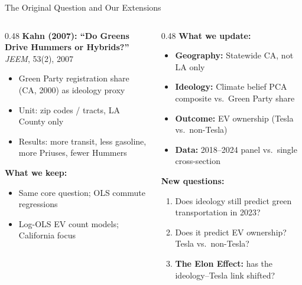 \documentclass[aspectratio=169,t]{beamer}
\begin{document}
\begin{frame}{The Original Question and Our Extensions}
  \begin{columns}[T]
    \begin{column}{0.48\textwidth}
      \footnotesize
      \textbf{Kahn (2007): ``Do Greens Drive Hummers or Hybrids?''}\\
      \textit{JEEM}, 53(2), 2007
      \begin{itemize}
        \item Green Party registration share (CA, 2000) as ideology proxy
        \item Unit: zip codes / tracts, LA County only
        \item Results: more transit, less gasoline, more Priuses, fewer Hummers
      \end{itemize}
      \textbf{What we keep:}
      \begin{itemize}
        \item Same core question; OLS commute regressions
        \item Log-OLS EV count models; California focus
      \end{itemize}
    \end{column}
    \begin{column}{0.48\textwidth}
      \footnotesize
      \textbf{What we update:}
      \begin{itemize}
        \item \textbf{Geography:} Statewide CA, not LA only
        \item \textbf{Ideology:} Climate belief PCA composite
              vs.\ Green Party share
        \item \textbf{Outcome:} EV ownership (Tesla vs.\ non-Tesla)
        \item \textbf{Data:} 2018--2024 panel vs.\ single cross-section
      \end{itemize}
      \textbf{New questions:}
      \begin{enumerate}
        \item Does ideology still predict green transportation in 2023?
        \item Does it predict EV ownership? Tesla vs.\ non-Tesla?
        \item \textbf{The Elon Effect:} has the ideology--Tesla link shifted?
      \end{enumerate}
    \end{column}
  \end{columns}
\end{frame}
\end{document}
